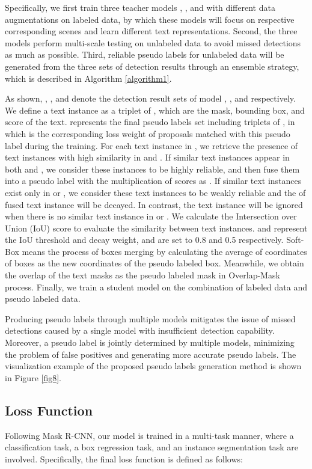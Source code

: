 Specifically, we first train three teacher models , , and  with different data augmentations on labeled data, by which these models will focus on respective corresponding scenes and learn different text representations. Second, the three models perform multi-scale testing on unlabeled data to avoid missed detections as much as possible. Third, reliable pseudo labels for unlabeled data will be generated from the three sets of detection results through an ensemble strategy, which is described in Algorithm \ref{algorithm1}.

As shown, , , and  denote the detection result sets of model , , and  respectively. We define a text instance as a triplet of , which are the mask, bounding box, and score of the text.  represents the final pseudo labels set including triplets of , in which  is the corresponding loss weight of proposals matched with this pseudo label during the training. For each text instance in , we retrieve the presence of text instances with high similarity in  and . If similar text instances appear in both  and , we consider these instances to be highly reliable, and then fuse them into a pseudo label with the multiplication of scores as . If similar text instances exist only in  or , we consider these text instances to be weakly reliable and the  of fused text instance will be decayed. In contrast, the text instance will be ignored when there is no similar text instance in  or . We calculate the Intersection over Union (IoU) score to evaluate the similarity between text instances.  and  represent the IoU threshold and decay weight, and are set to 0.8 and 0.5 respectively. Soft-Box means the process of boxes merging by calculating the average of coordinates of boxes as the new coordinates of the pseudo labeled box. Meanwhile, we obtain the overlap of the text masks as the pseudo labeled mask in Overlap-Mask process. Finally, we train a student model on the combination of labeled data and pseudo labeled data.

Producing pseudo labels through multiple models mitigates the issue of missed detections caused by a single model with insufficient detection capability. Moreover, a pseudo label is jointly determined by multiple models, minimizing the problem of false positives and generating more accurate pseudo labels. The visualization example of the proposed pseudo labels generation method is shown in Figure \ref{fig8}.


\subsection{Loss Function}
Following Mask R-CNN, our model is trained in a multi-task manner, where a classification task, a box regression task, and an instance segmentation task are involved. Specifically, the final loss function is defined as follows:

